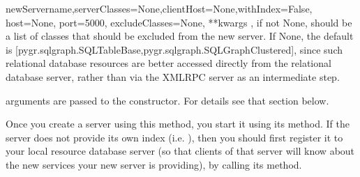 \documentclass{howto}
\begin{document}
\begin{funcdesc}{newServer}{name,serverClasses=None,clientHost=None,withIndex=False, host=None, port=5000, excludeClasses=None, **kwargs}
  , if not None, should be a list of classes that
  should be excluded from the new server.  If None, the default is
  [pygr.sqlgraph.SQLTableBase,pygr.sqlgraph.SQLGraphClustered], since
  such relational database resources are better accessed directly from
  the relational database server, rather than via the XMLRPC server as
  an intermediate step.

   arguments are passed to the  constructor.
  For details see that section below.

  Once you create a server using this method, you start it using its
   method.  If the server does not provide its
  own index (i.e. ), then you should first register
  it to your local resource database server (so that clients of that server
  will know about the new services your new server is providing), by
  calling its  method.
\end{funcdesc}
\end{document}

